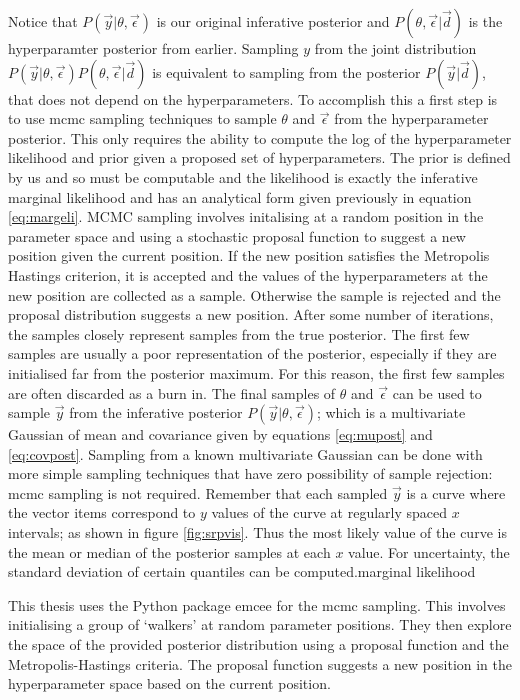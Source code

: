 Notice that $P(\vec y|\theta, \vec \epsilon)$  is our original inferative posterior and $P(\theta, \vec \epsilon|\vec d)$ is the hyperparamter posterior from earlier. Sampling $y$ from the joint distribution $P(\vec y|\theta, \vec \epsilon) P(\theta, \vec \epsilon|\vec d)$ is equivalent to sampling from the posterior $P(\vec y|\vec d)$, that does not depend on the hyperparameters. To accomplish this a first step is to use \gls{mcmc} sampling techniques to sample $\theta$ and $\vec \epsilon$ from the hyperparameter posterior. This only requires the ability to compute the log of the hyperparameter likelihood and prior given a proposed set of hyperparameters. The prior is defined by us and so must be computable and the likelihood is exactly the inferative marginal likelihood and has an analytical form given previously in equation \ref{eq:margeli}. MCMC sampling involves initalising at a random position in the parameter space and using a stochastic proposal function to suggest a new position given the current position. If the new position satisfies the Metropolis Hastings criterion, it is accepted and the values of the hyperparameters at the new position are collected as a sample. Otherwise the sample is rejected and the proposal distribution suggests a new position. After some number of iterations, the samples closely represent samples from the true posterior. The first few samples are usually a poor representation of the posterior, especially if they are initialised far from the posterior maximum. For this reason, the first few samples are often discarded as a burn in. The final samples of $\theta$ and $\vec \epsilon$ can be used to sample $\vec y$ from the inferative posterior $P(\vec y|\theta, \vec \epsilon)$; which is a multivariate Gaussian of mean and covariance given by equations \ref{eq:mupost} and \ref{eq:covpost}. Sampling from a known multivariate Gaussian can be done with more simple sampling techniques that have zero possibility of sample rejection: \gls{mcmc} sampling is not required. Remember that each sampled $\vec y$ is a curve where the vector items correspond to $y$ values of the curve at regularly spaced $x$ intervals; as shown in figure \ref{fig:srpvis}. Thus the most likely value of the curve is the mean or median of the posterior samples at each $x$ value. For uncertainty, the standard deviation of certain quantiles can be computed.marginal likelihood

This thesis uses the Python package emcee for the \gls{mcmc} sampling. This involves initialising a group of `walkers' at random parameter positions. They then explore the space of the provided posterior distribution using a proposal function and the Metropolis-Hastings criteria. The proposal function suggests a new position in the hyperparameter space based on the current position.

